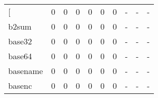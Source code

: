 \begin{longtable}{lp{1.3cm}p{1.3cm}p{1.3cm}p{1.3cm}p{1.3cm}p{1.3cm}p{1.3cm}p{1.3cm}p{1.3cm}}
\bottomrule
\endlastfoot
{[}         &                      0 &                                             0 &                                            0 &                                           0 &                                            0 &                                          0 &                                    - &                                      - &                                    - \\
b2sum     &                      0 &                                             0 &                                            0 &                                           0 &                                            0 &                                          0 &                                    - &                                      - &                                    - \\
base32    &                      0 &                                             0 &                                            0 &                                           0 &                                            0 &                                          0 &                                    - &                                      - &                                    - \\
base64    &                      0 &                                             0 &                                            0 &                                           0 &                                            0 &                                          0 &                                    - &                                      - &                                    - \\
basename  &                      0 &                                             0 &                                            0 &                                           0 &                                            0 &                                          0 &                                    - &                                      - &                                    - \\
basenc    &                      0 &                                             0 &                                            0 &                                           0 &                                            0 &                                          0 &                                    - &                                      - &                                    - \\

\end{longtable}
